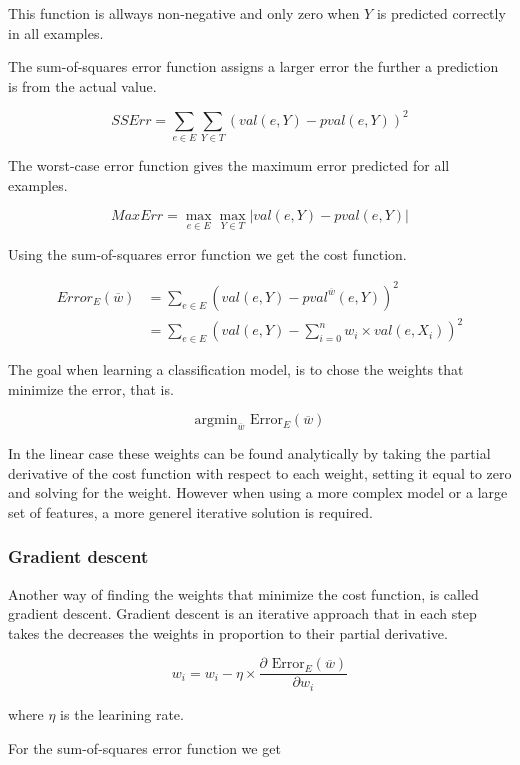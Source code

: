 This function is allways non-negative and only zero when $Y$ is predicted correctly in all examples. 

The sum-of-squares error function assigns a larger error the further a prediction is from the actual value.

$$SSErr = \sum_{e \in E}\sum_{Y \in T} (val(e,Y) - pval(e,Y))^2$$

The worst-case error function gives the maximum error predicted for all examples.

$$MaxErr = \max_{e \in E}\max_{Y \in T} | val(e,Y) - pval(e,Y) |$$

\begin{flushright}
\cite[p. 290-291]{AI2010}
\end{flushright}

Using the sum-of-squares error function we get the cost function.

\begin{align}
Error_E(\overline{w}) &= \sum_{e \in E} (val(e,Y)-pval^{\overline{w}}(e,Y))^2 \\
&= \sum_{e \in E} (val(e,Y)-\sum_{i=0}^n w_i \times val(e,X_i))^2
\end{align}

The goal when learning a classification model, is to chose the weights that minimize the error,
that is.

$$\text{argmin}_{\overline{w}} \text{ Error}_E(\overline{w})$$

In the linear case these weights can be found analytically by taking the partial derivative of the cost function with respect 
to each weight, setting it equal to zero and solving for the weight.
However when using a more complex model or a large set of features, a more generel iterative solution is required.

\subsubsection{Gradient descent}

Another way of finding the weights that minimize the cost function, is called gradient descent.
Gradient descent is an iterative approach that in each step takes the decreases the weights in
proportion to their partial derivative.

$$w_i = w_i - \eta \times \frac{\partial \text{ Error}_E(\overline{w})}{\partial w_i}$$ 

where $\eta$ is the learining rate.

For the sum-of-squares error function we get

